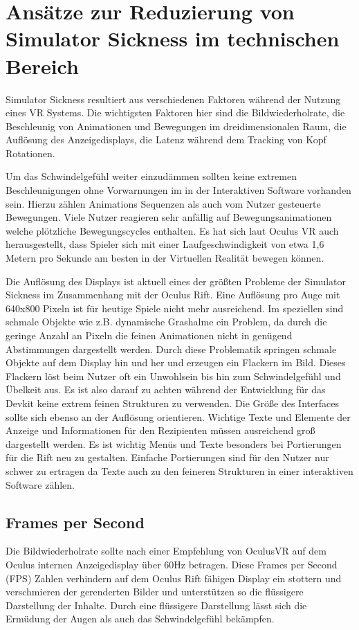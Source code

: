 \documentclass[pagesize, paper=a4, fontsize=12pt,titlepage=true, headings=small, headnosepline, abstractoff, liststotoc, nochapterprefix, plainheadsepline]{scrreprt}
\begin{document}
\section{Ansätze zur Reduzierung von Simulator Sickness im technischen Bereich}
Simulator Sickness resultiert aus verschiedenen Faktoren während der Nutzung eines VR Systems. Die wichtigsten Faktoren hier sind die Bildwiederholrate, die Beschleunig von Animationen und Bewegungen im dreidimensionalen Raum, die Auflösung des Anzeigedisplays, die Latenz während dem Tracking von Kopf Rotationen. 

Um das Schwindelgefühl weiter einzudämmen sollten keine extremen Beschleunigungen ohne Vorwarnungen im in der Interaktiven Software vorhanden sein. Hierzu zählen Animations Sequenzen als auch vom Nutzer gesteuerte Bewegungen. Viele Nutzer reagieren sehr anfällig auf Bewegungsanimationen welche plötzliche Bewegungscycles enthalten. Es hat sich laut Oculus VR auch herausgestellt, dass Spieler sich mit einer Laufgeschwindigkeit von etwa 1,6 Metern pro Sekunde am besten in der Virtuellen Realität bewegen können.

Die Auflösung des Displays ist aktuell eines der größten Probleme der Simulator Sickness im Zusammenhang mit der Oculus Rift.  Eine Auflösung pro Auge mit 640x800 Pixeln ist für heutige Spiele nicht mehr ausreichend. Im speziellen sind schmale Objekte wie z.B. dynamische Grashalme ein Problem, da durch die geringe Anzahl an Pixeln die feinen Animationen nicht in genügend Abstimmungen dargestellt werden. Durch diese Problematik springen schmale Objekte auf dem Display hin und her und erzeugen ein Flackern im Bild. Dieses Flackern löst beim Nutzer oft ein Unwohlsein bis hin zum Schwindelgefühl und Übelkeit aus. Es ist also darauf zu achten während der Entwicklung für das Devkit keine extrem feinen Strukturen zu verwenden. Die Größe des Interfaces sollte sich ebenso an der Auflösung orientieren. Wichtige Texte und Elemente der Anzeige und Informationen für den Rezipienten müssen ausreichend groß dargestellt werden. Es ist wichtig Menüs und Texte besonders bei Portierungen für die Rift neu zu gestalten. Einfache Portierungen sind für den Nutzer nur schwer zu ertragen da Texte auch zu den feineren Strukturen in einer interaktiven Software zählen.

\subsection{Frames per Second}
Die Bildwiederholrate sollte nach einer Empfehlung von OculusVR auf dem Oculus internen Anzeigedisplay über 60Hz betragen. Diese Frames per Second (FPS) Zahlen verhindern auf dem Oculus Rift fähigen Display ein stottern und verschmieren der gerenderten Bilder und unterstützen so die flüssigere Darstellung der Inhalte. Durch eine flüssigere Darstellung lässt sich die Ermüdung der Augen als auch das Schwindelgefühl bekämpfen.
\end{document}
